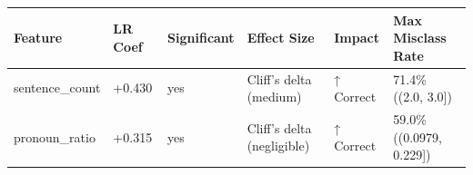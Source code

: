 \begin{tabular}{llllll}
\toprule
Feature & LR Coef & Significant & Effect Size & Impact & Max Misclass Rate \\
\midrule
sentence\_count & +0.430 & yes & Cliff's delta (medium) & ↑ Correct & 71.4\% ((2.0, 3.0]) \\
pronoun\_ratio & +0.315 & yes & Cliff's delta (negligible) & ↑ Correct & 59.0\% ((0.0979, 0.229]) \\
\bottomrule
\end{tabular}

